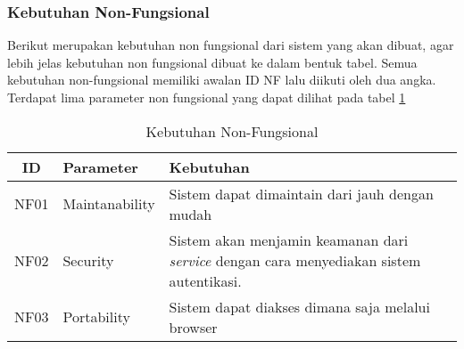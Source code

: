 \subsubsection{Kebutuhan Non-Fungsional}
Berikut merupakan kebutuhan non fungsional dari sistem yang akan dibuat, agar lebih jelas kebutuhan non fungsional dibuat ke dalam bentuk tabel. Semua kebutuhan non-fungsional memiliki awalan ID NF lalu diikuti oleh dua angka. Terdapat lima parameter non fungsional yang dapat dilihat pada tabel \ref{tab:kebutuhan-non-fungsional}

\bgroup
\begin{table}[h]
  \def\arraystretch{1.7}
  \caption{Kebutuhan Non-Fungsional}
  \label{tab:kebutuhan-non-fungsional}
  \centering
  \begin{tabular}{|c|p{3cm}|p{8cm}|}
    \hline
    ID   & Parameter      & Kebutuhan                                                                                       \\
    \hline
    NF01 & Maintanability & Sistem dapat dimaintain dari jauh dengan mudah                                                  \\
    \hline
    NF02 & Security       & Sistem akan menjamin keamanan dari \textit{service} dengan cara menyediakan sistem autentikasi. \\
    \hline
    NF03 & Portability    & Sistem dapat diakses dimana saja melalui browser                                                \\
    \hline
  \end{tabular}
\end{table}
\egroup